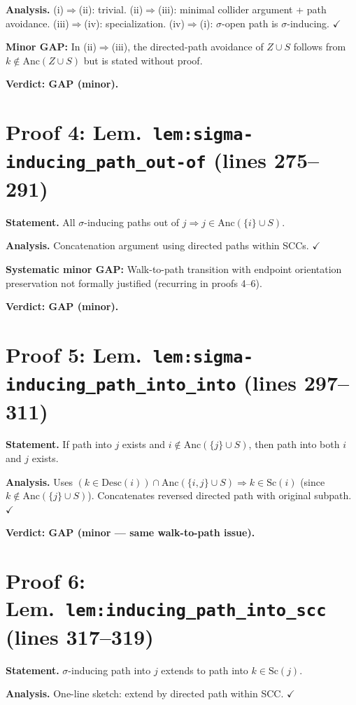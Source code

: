 \documentclass{article}
\begin{document}
\textbf{Analysis.} (i)$\Rightarrow$(ii): trivial. (ii)$\Rightarrow$(iii): minimal
collider argument + path avoidance.  (iii)$\Rightarrow$(iv): specialization.
(iv)$\Rightarrow$(i): $\sigma$-open path is $\sigma$-inducing.  $\checkmark$

\textbf{Minor GAP:} In (ii)$\Rightarrow$(iii), the directed-path avoidance of
$Z\cup S$ follows from $k\notin\mathrm{Anc}(Z\cup S)$ but is stated without proof.

\textbf{Verdict: GAP (minor).}

\section{Proof 4: Lem.\ \texttt{lem:sigma-inducing\_path\_out-of} (lines 275--291)}
\textbf{Statement.} All $\sigma$-inducing paths out of $j\Rightarrow j\in\mathrm{Anc}(\{i\}\cup S)$.

\textbf{Analysis.} Concatenation argument using directed paths within SCCs.
$\checkmark$

\textbf{Systematic minor GAP:} Walk-to-path transition with endpoint orientation
preservation not formally justified (recurring in proofs 4--6).

\textbf{Verdict: GAP (minor).}

\section{Proof 5: Lem.\ \texttt{lem:sigma-inducing\_path\_into\_into} (lines 297--311)}
\textbf{Statement.} If path into $j$ exists and $i\notin\mathrm{Anc}(\{j\}\cup S)$,
then path into both $i$ and $j$ exists.

\textbf{Analysis.} Uses $(k\in\mathrm{Desc}(i))\cap\mathrm{Anc}(\{i,j\}\cup S)
\Rightarrow k\in\mathrm{Sc}(i)$ (since $k\notin\mathrm{Anc}(\{j\}\cup S)$).
Concatenates reversed directed path with original subpath.  $\checkmark$

\textbf{Verdict: GAP (minor --- same walk-to-path issue).}

\section{Proof 6: Lem.\ \texttt{lem:inducing\_path\_into\_scc} (lines 317--319)}
\textbf{Statement.} $\sigma$-inducing path into $j$ extends to path into $k\in\mathrm{Sc}(j)$.

\textbf{Analysis.} One-line sketch: extend by directed path within SCC.
$\checkmark$
\end{document}
